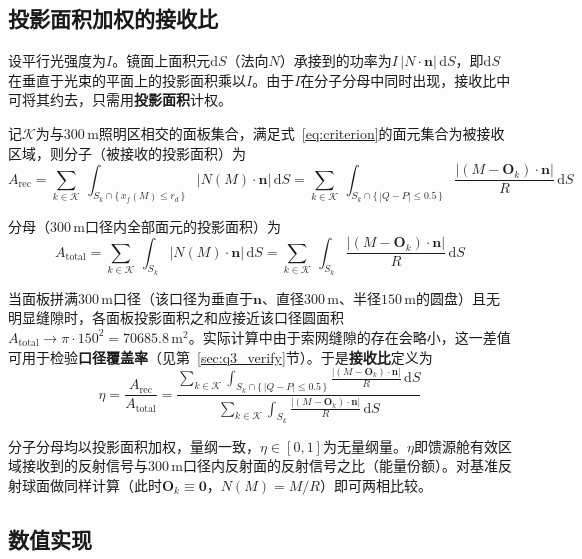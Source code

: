 \documentclass[withoutpreface]{cumcmthesis}
\begin{document}
\subsection{投影面积加权的接收比}

设平行光强度为$I$。镜面上面积元$\mathrm{d}S$（法向$N$）承接到的功率为$I\,|N\cdot\mathbf{n}|\,\mathrm{d}S$，即$\mathrm{d}S$在垂直于光束的平面上的投影面积乘以$I$。由于$I$在分子分母中同时出现，接收比中可将其约去，只需用\textbf{投影面积}计权。

记$\mathcal{K}$为与$300\,\mathrm{m}$照明区相交的面板集合，满足式~\eqref{eq:criterion}的面元集合为被接收区域，则分子（被接收的投影面积）为
\begin{equation}\label{eq:arec}
A_{\mathrm{rec}}=\sum_{k\in\mathcal{K}}\ \int_{S_k\cap\{\,x_f(M)\le r_d\,\}}|N(M)\cdot\mathbf{n}|\,\mathrm{d}S
=\sum_{k\in\mathcal{K}}\ \int_{S_k\cap\{\,|Q-P|\le0.5\,\}}\frac{|(M-\mathbf{O}_k)\cdot\mathbf{n}|}{R}\,\mathrm{d}S
\end{equation}

分母（$300\,\mathrm{m}$口径内全部面元的投影面积）为
\begin{equation}\label{eq:atot}
A_{\mathrm{total}}=\sum_{k\in\mathcal{K}}\ \int_{S_k}|N(M)\cdot\mathbf{n}|\,\mathrm{d}S
=\sum_{k\in\mathcal{K}}\ \int_{S_k}\frac{|(M-\mathbf{O}_k)\cdot\mathbf{n}|}{R}\,\mathrm{d}S
\end{equation}

当面板拼满$300\,\mathrm{m}$口径（该口径为垂直于$\mathbf{n}$、直径$300\,\mathrm{m}$、半径$150\,\mathrm{m}$的圆盘）且无明显缝隙时，各面板投影面积之和应接近该口径圆面积$A_{\mathrm{total}}\to\pi\cdot150^{2}=70685.8\,\mathrm{m}^{2}$。实际计算中由于索网缝隙的存在会略小，这一差值可用于检验\textbf{口径覆盖率}（见第~\ref{sec:q3_verify}节）。于是\textbf{接收比}定义为
\begin{equation}\label{eq:eta}
\eta=\frac{A_{\mathrm{rec}}}{A_{\mathrm{total}}}
=\frac{\displaystyle\sum_{k\in\mathcal{K}}\int_{S_k\cap\{\,|Q-P|\le0.5\,\}}\frac{|(M-\mathbf{O}_k)\cdot\mathbf{n}|}{R}\,\mathrm{d}S}
{\displaystyle\sum_{k\in\mathcal{K}}\int_{S_k}\frac{|(M-\mathbf{O}_k)\cdot\mathbf{n}|}{R}\,\mathrm{d}S}
\end{equation}

分子分母均以投影面积加权，量纲一致，$\eta\in[0,1]$为无量纲量。$\eta$即馈源舱有效区域接收到的反射信号与$300\,\mathrm{m}$口径内反射面的反射信号之比（能量份额）。对基准反射球面做同样计算（此时$\mathbf{O}_k\equiv\mathbf{0}$，$N(M)=M/R$）即可两相比较。

\subsection{数值实现}\label{sec:q3_num}
\end{document}

